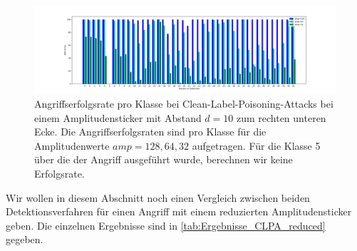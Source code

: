 \documentclass[11pt,a4paper]{article}
\numberwithin{equation}{section}
\begin{document}
	
	\begin{figure}[!h]
		\begin{center}
			\includegraphics[width=\textwidth]{vergleich_CLPA_AER_amp.png}
			\caption{Angriffserfolgsrate pro Klasse bei Clean-Label-Poisoning-Attacks bei einem Amplitudensticker mit Abstand $d=10$ zum rechten unteren Ecke. Die Angriffserfolgsraten sind pro Klasse für die Amplitudenwerte $amp=128,64,32$ aufgetragen. Für die Klasse 5 über die der Angriff ausgeführt wurde, berechnen wir keine Erfolgsrate.}
			\label{fig:AER_proKlasse_CLPA_amp}
		\end{center}
	\end{figure}
	
	
	\begin{table}[!h]
		\caption{Ergebnisse der Detektion von CLPA mit reduzierten Stickern.}
		\begin{center}
		\end{center}
	
		\label{tab:Ergebnisse_CLPA_reduced}
		
	\end{table}

Wir wollen in diesem Abschnitt noch einen Vergleich zwischen beiden Detektionsverfahren für einen Angriff mit einem reduzierten Amplitudensticker geben. Die einzelnen Ergebnisse sind in \autoref{tab:Ergebnisse_CLPA_reduced} gegeben. 
\end{document}

